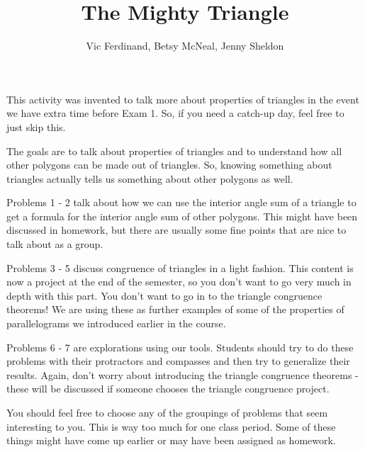 \documentclass[nooutcomes]{ximera}
\title{The Mighty Triangle}
\author{Vic Ferdinand, Betsy McNeal, Jenny Sheldon}
\begin{document}
\begin{abstract}
\end{abstract}
\maketitle

\begin{instructorIntro}
This activity was invented to talk more about properties of triangles in the event we have extra time before Exam 1.  So, if you need a catch-up day, feel free to just skip this.

The goals are to talk about properties of triangles and to understand how all other polygons can be made out of triangles.  So, knowing something about triangles actually tells us something about other polygons as well.

Problems 1 - 2 talk about how we can use the interior angle sum of a triangle to get a formula for the interior angle sum of other polygons.  This might have been discussed in homework, but there are usually some fine points that are nice to talk about as a group.

Problems 3 - 5 discuss congruence of triangles in a light fashion.  This content is now a project at the end of the semester, so you don't want to go very much in depth with this part.  You don't want to go in to the triangle congruence theorems!  We are using these as further examples of some of the properties of parallelograms we introduced earlier in the course.

Problems 6 - 7 are explorations using our tools.  Students should try to do these problems with their protractors and compasses and then try to generalize their results.  Again, don't worry about introducing the triangle congruence theorems - these will be discussed if someone chooses the triangle congruence project.

You should feel free to choose any of the groupings of problems that seem interesting to you.  This is way too much for one class period.  Some of these things might have come up earlier or may have been assigned as homework.

\end{instructorIntro}
\end{document}
